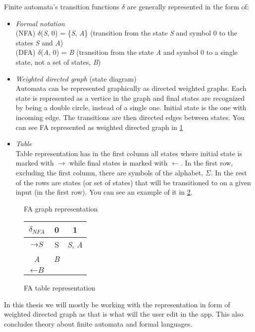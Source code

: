 Finite automata's transition functions $\delta$ are generally represented in the form of:
\begin{itemize}
    \item \textit{Formal notation}\\
    (NFA) $\delta$(\textit{S}, 0) = \{\textit{S}, \textit{A}\} (transition from the state \textit{S} and symbol 0 to the states \textit{S} and \textit{A})\\
    (DFA) $\delta$(\textit{A}, 0) = \textit{B} (transition from the state \textit{A} and symbol 0 to a single state, not a set of states, \textit{B})
    \item \textit{Weighted directed graph} (state diagram)\\
    Automata can be represented graphically as directed weighted graphs. Each state is represented as a vertice in the graph and final states are recognized by being a double circle, instead of a single one. Initial state is the one with incoming edge. The transitions are then directed edges between states. You can see FA represented as weighted directed graph in \ref{graph-representation}
    \item \textit{Table}\\
    Table representation has in the first column all states where initial state is marked with $\rightarrow$ while final states is marked with $\leftarrow$. In the first row, excluding the first column, there are symbols of the alphabet, $\Sigma$. In the rest of the rows are states (or set of states) that will be transitioned to on a given input (in the first row). You can see an example of it in \ref{table-representation}.
\end{itemize}
\begin{figure}
\caption{FA graph representation}\label{graph-representation}
\end{figure}
\begin{figure}
\begin{tabular}{||c|c|c||} 
    \hline
    $\delta_{NFA}$ & 0 & 1 \\ [0.5ex] 
    \hline\hline
    $\rightarrow \textit{S}$ & S & \textit{S}, \textit{A} \\ 
    \hline
    \textit{A} & \textit{B} & \\
    \hline
    $\leftarrow \textit{B}$ &  & \\
    \hline
\end{tabular}
\caption{FA table representation}\label{table-representation}
\end{figure}
In this thesis we will mostly be working with the representation in form of weighted directed graph as that is what will the user edit in the app.
This also concludes theory about finite automata and formal languages.

